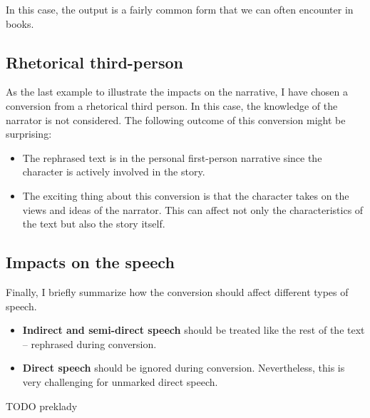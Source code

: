In this case, the output is a fairly common form that we can often encounter in books.

\subsection*{Rhetorical third-person}

As the last example to illustrate the impacts on the narrative, I have chosen a conversion from a rhetorical third person. In this case, the knowledge of the narrator is not considered. The following outcome of this conversion might be surprising:

\begin{itemize}
	\item The rephrased text is in the personal first-person narrative since the character is actively involved in the story.
	\item The exciting thing about this conversion is that the character takes on the views and ideas of the narrator. This can affect not only the characteristics of the text but also the story itself.
\end{itemize}


\subsection*{Impacts on the speech}

Finally, I briefly summarize how the conversion should affect different types of speech.

\begin{itemize}
	\item \textbf{Indirect and semi-direct speech} should be treated like the rest of the text -- rephrased during conversion.
	\item \textbf{Direct speech} should be ignored during conversion. Nevertheless, this is very challenging for unmarked direct speech.
\end{itemize}


TODO preklady
